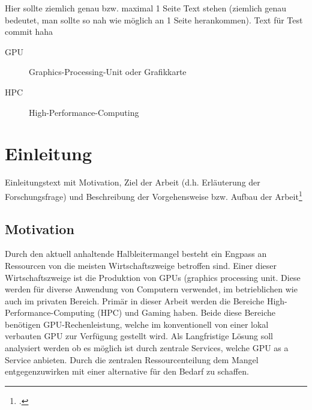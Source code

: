 \documentclass[12pt,toc=bib,toc=listof]{scrreprt}
\title{\topic}
\author{\studentnameA { ({\studentidA)}}, \\ \studentnameB { ({\studentidB)}}, \\ \studentnameC { ({\studentidC)}} }
\date {\semester}
\newcounter{savepage}
\begin{document}
\sffamily
\maketitle

\label{sec:management_summary}

Hier sollte ziemlich genau bzw. maximal 1 Seite Text stehen (ziemlich genau  bedeutet, man sollte so nah wie möglich an 1 Seite herankommen).
Text für Test commit haha


\tableofcontents

\label{sec:abkuerzungsverzeichnis}

\begin{description}
\item[GPU] Graphics-Processing-Unit oder Grafikkarte
\item[HPC] High-Performance-Computing
\end{description}


\listoffigures
\listoftables


\newpage

\chapter{Einleitung} %
\label{sec:einleitung}

Einleitungstext mit Motivation, Ziel der Arbeit (d.h. Erläuterung der Forschungsfrage) und Beschreibung der Vorgehensweise bzw. Aufbau der Arbeit\footcite [vgl.] [S. 38]{Th17}

\section{Motivation} %
\label{sec:motivation}
Durch den aktuell anhaltende Halbleitermangel besteht ein Engpass an Ressourcen von die meisten Wirtschaftszweige betroffen sind.
Einer dieser Wirtschaftszweige ist die Produktion von GPUs (graphics processing unit. Diese werden für diverse Anwendung von Computern verwendet, im betrieblichen wie auch im privaten Bereich.
Primär in dieser Arbeit werden die Bereiche High-Performance-Computing (HPC) und Gaming haben.
Beide diese Bereiche benötigen GPU-Rechenleistung, welche im konventionell von einer lokal verbauten GPU zur Verfügung gestellt wird. 
Als Langfristige Lösung soll analysiert werden ob es möglich ist durch zentrale Services, welche GPU as a Service anbieten. 
Durch die zentralen Ressourcenteilung dem Mangel entgegenzuwirken mit einer alternative für den Bedarf zu schaffen.
\end{document}
